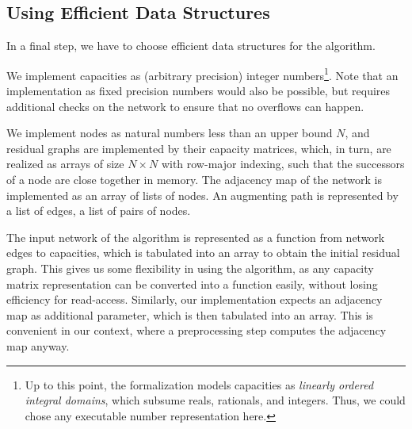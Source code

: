 \documentclass[smallcondensed]{svjour3}     %
\newcommand{\isai}{\lstinline[language=isabelle,basicstyle=\normalsize\ttfamily\slshape]}
\begin{document}
  \subsection{Using Efficient Data Structures}\label{sec:impl_data_structures}
  In a final step, we have to choose efficient data structures for the algorithm. 

  
  We implement capacities as (arbitrary precision) integer numbers\footnote{Up to this point, the formalization models capacities as \emph{linearly ordered integral domains}, which subsume reals, rationals, and integers. Thus, we could chose any executable number representation here.}. Note that an implementation as fixed precision numbers would also be possible,
  but requires additional checks on the network to ensure that no overflows can happen. 
  
  We implement nodes as natural numbers less than an upper bound $N$, and residual graphs are implemented by their capacity matrices, which, in turn,
  are realized as arrays of size $N\times N$ with row-major indexing, such that the successors of a node are close together in memory.
  The adjacency map of the network is implemented as an array of lists of nodes. 
  An augmenting path is represented by a list of edges, \ie a list of pairs of nodes. 
  
  
  
  
  The input network of the algorithm is represented as a function from network edges to capacities, which is tabulated into an array
  to obtain the initial residual graph. This gives us some flexibility in using the algorithm, as any capacity matrix representation can be converted into a 
  function easily, without losing efficiency for read-access. 
  Similarly, our implementation expects an adjacency map as additional parameter, which is then tabulated into an array. This is convenient in our context, where a preprocessing step computes the adjacency map anyway.
      
\end{document}
